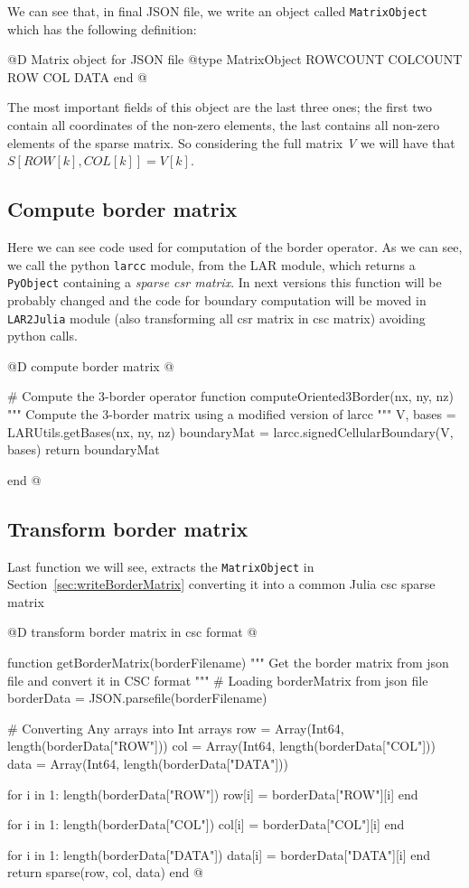 \documentclass[11pt,oneside]{article}	%
\begin{document}
We can see that, in final JSON file, we write an object called \texttt{MatrixObject} which has the following definition:

@D Matrix object for JSON file
@{type MatrixObject
  ROWCOUNT
  COLCOUNT
  ROW
  COL
  DATA
end @}

The most important fields of this object are the last three ones; the first two contain all coordinates of the non-zero elements, the last contains all non-zero elements of the sparse matrix. So considering the full matrix \textit{V} we will have that $S[ROW[k], COL[k]] = V[k]$.

\subsection{Compute border matrix}\label{sec:computeBorder}

Here we can see code used for computation of the border operator. As we can see, we call the python \texttt{larcc} module, from the LAR module, which returns a \texttt{PyObject} containing a \textit{sparse csr matrix}. In next versions this function will be probably changed and the code for boundary computation will be moved in \texttt{LAR2Julia} module (also transforming all csr matrix in csc matrix) avoiding python calls.

@D compute border matrix
@{# Compute the 3-border operator
function computeOriented3Border(nx, ny, nz)
  """
  Compute the 3-border matrix using a modified
  version of larcc
  """
  V, bases = LARUtils.getBases(nx, ny, nz)
  boundaryMat = larcc.signedCellularBoundary(V, bases)
  return boundaryMat

end @}

\subsection{Transform border matrix}\label{sec:transformBorder}

Last function we will see, extracts the \texttt{MatrixObject} in Section~\ref{sec:writeBorderMatrix} converting it into a common Julia csc sparse matrix

@D transform border matrix in csc format
@{function getBorderMatrix(borderFilename)
  """
  Get the border matrix from json file and convert it in
  CSC format
  """
  # Loading borderMatrix from json file
  borderData = JSON.parsefile(borderFilename)
  
  # Converting Any arrays into Int arrays
  row = Array(Int64, length(borderData["ROW"]))
  col = Array(Int64, length(borderData["COL"]))
  data = Array(Int64, length(borderData["DATA"]))

  for i in 1: length(borderData["ROW"])
    row[i] = borderData["ROW"][i]
  end

  for i in 1: length(borderData["COL"])
    col[i] = borderData["COL"][i]
  end

  for i in 1: length(borderData["DATA"])
    data[i] = borderData["DATA"][i]
  end
  return sparse(row, col, data)
end @}
\end{document}
